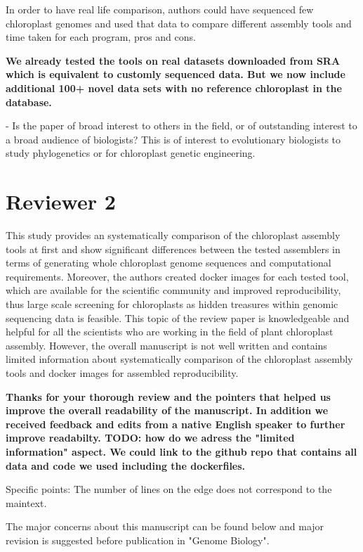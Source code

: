 \documentclass[a4paper,10pt]{scrartcl}
\begin{document}
In order to have real life comparison, authors could have sequenced few chloroplast genomes and used that data to compare different assembly tools and time taken for each program, pros and cons.

\textbf{
We already tested the tools on real datasets downloaded from SRA which is equivalent to customly sequenced data.
But we now include additional 100+ novel data sets with no reference chloroplast in the database.
}

- Is the paper of broad interest to others in the field, or of outstanding interest to a broad audience of biologists?
This is of interest to evolutionary biologists to study phylogenetics or for chloroplast genetic engineering.

\section{Reviewer 2}
This study provides an systematically comparison of the chloroplast assembly tools at first and show significant differences between the tested assemblers in terms of generating whole chloroplast genome sequences and computational requirements.
Moreover, the authors created docker images for each tested tool, which are available for the scientific community and improved reproducibility, thus large scale screening for chloroplasts as hidden treasures within genomic sequencing data is feasible.
This topic of the review paper is knowledgeable and helpful for all the scientists who are working in the field of plant chloroplast assembly.
However, the overall manuscript is not well written and contains limited information about systematically comparison of the chloroplast assembly tools and docker images for assembled reproducibility.

\textbf{
Thanks for your thorough review and the pointers that helped us improve the overall readability of the manuscript.
In addition we received feedback and edits from a native English speaker to further improve readabilty.
TODO: how do we adress the "limited information" aspect. We could link to the github repo that contains all data and code we used including the dockerfiles.
}

Specific points: The number of lines on the edge does not correspond to the maintext.

The major concerns about this manuscript can be found below and major revision is suggested before publication in "Genome Biology".
\end{document}
